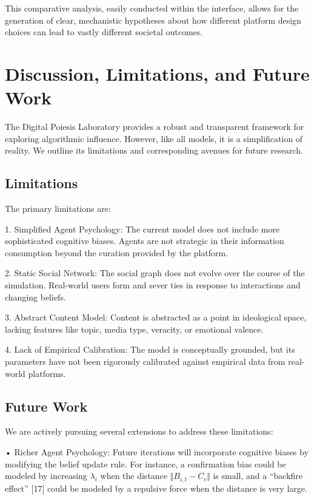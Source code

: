 \documentclass[11pt]{article}
\begin{document}
This comparative analysis, easily conducted within the interface, allows for the generation of clear, mechanistic hypotheses about how different platform design choices can lead to vastly different societal outcomes.

\section{Discussion, Limitations, and Future Work}

The Digital Poiesis Laboratory provides a robust and transparent framework for exploring algorithmic influence. However, like all models, it is a simplification of reality. We outline its limitations and corresponding avenues for future research.

\subsection{Limitations}

The primary limitations are:

1. Simplified Agent Psychology: The current model does not include more sophisticated cognitive biases. Agents are not strategic in their information consumption beyond the curation provided by the platform.

2. Static Social Network: The social graph does not evolve over the course of the simulation. Real-world users form and sever ties in response to interactions and changing beliefs.

3. Abstract Content Model: Content is abstracted as a point in ideological space, lacking features like topic, media type, veracity, or emotional valence.

4. Lack of Empirical Calibration: The model is conceptually grounded, but its parameters have not been rigorously calibrated against empirical data from real-world platforms.

\subsection{Future Work}

We are actively pursuing several extensions to address these limitations:

• Richer Agent Psychology: Future iterations will incorporate cognitive biases by modifying the belief update rule. For instance, a confirmation bias could be modeled by increasing $\lambda_i$ when the distance $\Vert B_{i,t} - C_c \Vert$ is small, and a ``backfire effect'' [17] could be modeled by a repulsive force when the distance is very large.
\end{document}
